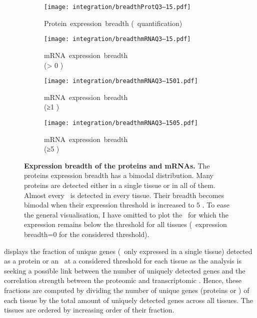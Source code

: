 \begin{figure}[!htb]
    \begin{subfigure}[h]{0.53\textwidth}
    \captionsetup{margin=0.6cm,justification=centering}
        \centering \texttt{[image: integration/breadthProtQ3--15.pdf]}
        \caption{Protein~expression~breadth (\PPKM~quantification)}\label{fig:protBreadth}
    \end{subfigure}
    \begin{subfigure}[h]{0.53\textwidth}
    \captionsetup{margin=0.6cm,justification=centering}
        \centering \texttt{[image: integration/breadthmRNAQ3--15.pdf]}
        \caption{mRNA~expression~breadth\\(> 0 \FPKM)}\label{fig:mRNAbreadth0}
    \end{subfigure}
    \vspace{2.5mm}

    \begin{subfigure}[b]{0.53\textwidth}
    \captionsetup{margin=0.6cm,justification=centering}
        \centering \texttt{[image: integration/breadthmRNAQ3--1501.pdf]}
        \caption{mRNA~expression~breadth\\(≥1 \FPKM)}\label{fig:mRNAbreadth1}
    \end{subfigure}
    \begin{subfigure}[b]{0.53\textwidth}
    \captionsetup{margin=0.6cm,justification=centering}
        \centering \texttt{[image: integration/breadthmRNAQ3--1505.pdf]}
        \caption{mRNA~expression~breadth\\(≥5 \FPKM)}\label{fig:mRNAbreadth5}
    \end{subfigure}
    \vspace{-6mm}
    \caption[Expression breadth of the proteins and mRNAs]{\label{fig:expressionBreadth}%
    \textbf{Expression breadth of the proteins and mRNAs.}
    The proteins expression breadth has a bimodal distribution.
    Many proteins are detected either in a single tissue or in all of them.
    Almost every \mRNA\ is detected in every tissue.
    Their breadth becomes bimodal when their expression threshold
    is increased to $5$ \FPKM{}.
    To ease the general visualisation,
    I have omitted to plot the \mRNAs\
    for which the expression remains below the threshold for all tissues
    (\ie\ expression breadth=0 for the considered threshold).
    }
\end{figure}

 displays the fraction of unique genes
(\ie\ only expressed in a single tissue)
detected as a protein or an \mRNA\ at a considered threshold for each tissue as
the analysis is seeking a possible link between
the number of uniquely detected genes
and the correlation strength between the proteomic and transcriptomic \treps{}.
Hence, these fractions are computed by dividing
the number of unique genes (proteins or \mRNAs) of each tissue
by the total amount of uniquely detected genes across all tissues.
The tissues are ordered by increasing order of their fraction.\mybr\

